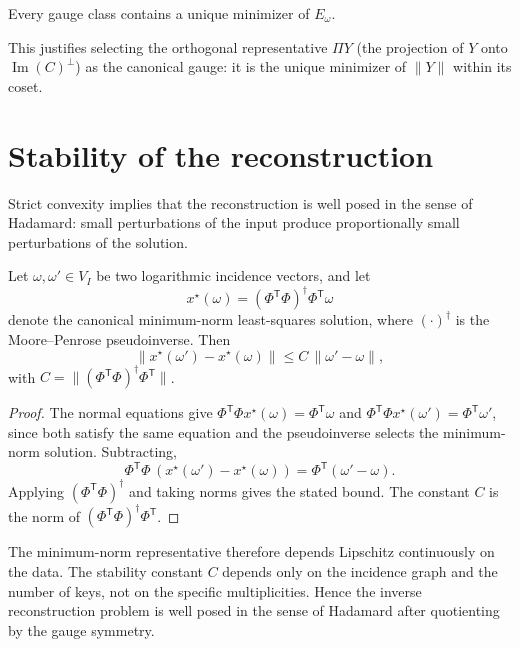 \begin{corollary}\label{ch:cor:unique-min-mod-gauge}
Every gauge class contains a unique minimizer of $E_\omega$.
\end{corollary}
This justifies selecting the orthogonal representative $\Pi Y$ (the projection of $Y$ onto $\operatorname{Im}(C)^\perp$) as the canonical gauge: it is the unique minimizer of $\|Y\|$ within its coset.
\section{Stability of the reconstruction}\label{ch:sec:stability-of-the-reconstruction}
Strict convexity implies that the reconstruction is well posed in the
sense of Hadamard: small perturbations of the input produce
proportionally small perturbations of the solution.
\begin{theorem}[Stability]\label{ch:thm:stability}
Let $\omega,\omega'\in V_I$ be two logarithmic incidence vectors, and let
\[
x^\star(\omega)=(\Phi^{\mathsf T}\Phi)^\dagger\Phi^{\mathsf T}\omega
\]
denote the canonical minimum-norm least-squares solution, where $(\cdot)^\dagger$ is the Moore--Penrose pseudoinverse.  Then
\[
\|x^\star(\omega')-x^\star(\omega)\| \le C\,\|\omega'-\omega\|,
\]
with $C=\|(\Phi^{\mathsf T}\Phi)^\dagger\Phi^{\mathsf T}\|$.
\end{theorem}
\begin{proof}
The normal equations give $\Phi^{\mathsf T}\Phi x^\star(\omega) = \Phi^{\mathsf T}\omega$ and $\Phi^{\mathsf T}\Phi x^\star(\omega') = \Phi^{\mathsf T}\omega'$, since both satisfy the same equation and the pseudoinverse selects the minimum-norm solution.  Subtracting,
\[
\Phi^{\mathsf T}\Phi\,(x^\star(\omega')-x^\star(\omega)) = \Phi^{\mathsf T}(\omega'-\omega).
\]
Applying $(\Phi^{\mathsf T}\Phi)^\dagger$ and taking norms gives the stated bound.  The constant $C$ is the norm of $(\Phi^{\mathsf T}\Phi)^\dagger\Phi^{\mathsf T}$.
\end{proof}

The minimum-norm representative therefore depends Lipschitz continuously
on the data.  The stability constant $C$ depends only on the incidence
graph and the number of keys, not on the specific multiplicities.
Hence the inverse reconstruction problem is well posed in the sense of
Hadamard after quotienting by the gauge symmetry.
